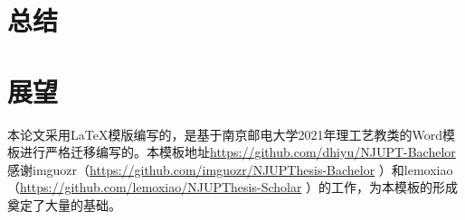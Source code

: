 \documentclass[bachelor]{njupthesis}
\begin{document}
\section{总结}
\section{展望}


\thesisconclusion

\thesisacknowledgement

本论文采用\LaTeX 模版编写的，是基于南京邮电大学2021年理工艺教类的Word模板进行严格迁移编写的。本模板地址\url{https://github.com/dhiyu/NJUPT-Bachelor}感谢imguozr（\url{https://github.com/imguozr/NJUPThesis-Bachelor} ）和lemoxiao（\url{https://github.com/lemoxiao/NJUPThesis-Scholar} ）的工作，为本模板的形成奠定了大量的基础。

\thesisreference
\end{document}

